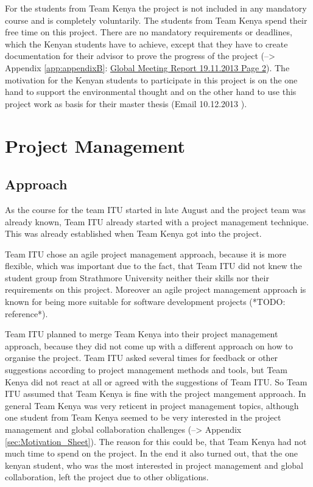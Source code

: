 For the students from Team Kenya the project is not included in any mandatory course and is completely voluntarily. The students from Team Kenya spend their free time on this project. There are no mandatory requirements or deadlines, which the Kenyan students have to achieve, except that they have to create documentation for their advisor to prove the progress of the project (--> Appendix \ref{app:appendixB}: \hyperlink{GSD20131119.2}{Global Meeting Report 19.11.2013 Page 2}). The motivation for the Kenyan students to participate in this project is on the one hand to support the environmental thought and on the other hand to use this project work as basis for their master thesis (Email 10.12.2013 ).


\section{Project Management}

\subsection{Approach}

As the course for the team ITU started in late August and the project team was already known, Team ITU already started with a project management technique. This was already established when Team Kenya got into the project.

Team ITU chose an agile project management approach, because it is more flexible, which was important due to the fact, that Team ITU did not knew the student group from Strathmore University neither their skills nor their requirements on this project. Moreover an agile project management approach is known for being more suitable for software development projects (*TODO: reference*).

Team ITU planned to merge Team Kenya into their project management approach, because they did not come up with a different approach on how to organise the project. Team ITU asked several times for feedback or other suggestions according to project management methods and tools, but Team Kenya did not react at all or agreed with the suggestions of Team ITU. So Team ITU assumed that Team Kenya is fine with the project mangement approach. In general Team Kenya was very reticent in project management topics, although one student from Team Kenya seemed to be very interested in the project management and global collaboration challenges (--> Appendix \ref{sec:Motivation_Sheet}). The reason for this could be, that Team Kenya had not much time to spend on the project. In the end it also turned out, that the one kenyan student, who was the most interested in project management and global collaboration, left the project due to other obligations.

